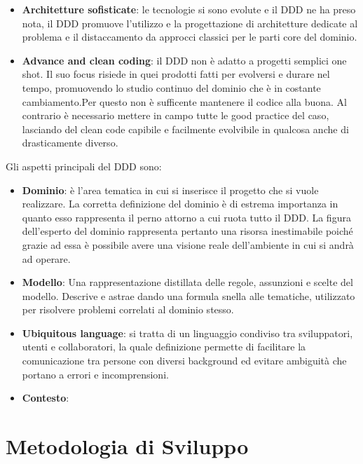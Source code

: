 \begin{itemize}
        \item \textbf{Architetture sofisticate}: le tecnologie si sono evolute e il DDD ne ha preso nota, il DDD promuove l'utilizzo e la progettazione di architetture dedicate al problema e il distaccamento da approcci classici per le parti core del dominio.
        
        \item \textbf{Advance and clean coding}: il DDD non è adatto a progetti semplici one shot. Il suo focus risiede in quei prodotti fatti per evolversi e durare nel tempo, promuovendo lo studio continuo del dominio che è in costante cambiamento.Per questo non è sufficente mantenere il codice alla buona. Al contrario è necessario mettere in campo tutte le good practice del caso, lasciando del clean code capibile e facilmente evolvibile in qualcosa anche di drasticamente diverso. 
        
        
    \end{itemize}
    
    
    
    Gli aspetti principali del DDD sono:
    \begin{itemize}
        \item \textbf{Dominio}: è l'area tematica in cui si inserisce il progetto che si vuole realizzare. La corretta definizione del dominio è di estrema importanza in quanto esso rappresenta il perno attorno a cui ruota tutto il DDD. La figura dell'esperto del dominio rappresenta pertanto una risorsa inestimabile poiché grazie ad essa è possibile avere una visione reale dell'ambiente in cui si andrà ad operare. 
        \item \textbf{Modello}: Una rappresentazione distillata delle regole, assunzioni e scelte del modello. Descrive e astrae dando una formula snella alle tematiche, utilizzato per risolvere problemi correlati al dominio stesso.
        \item \textbf{Ubiquitous language}: si tratta di un linguaggio condiviso tra sviluppatori, utenti e collaboratori, la quale definizione permette di facilitare la comunicazione tra persone con diversi background ed evitare ambiguità che portano a errori e incomprensioni.
        \item \textbf{Contesto}: %
    \end{itemize}

\section{Metodologia di Sviluppo}

